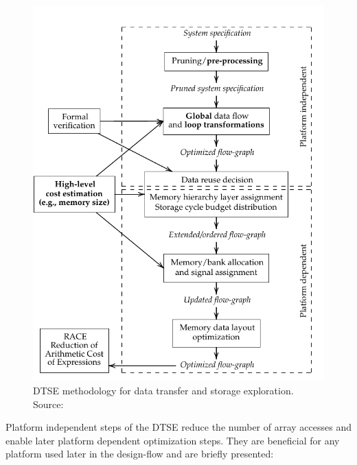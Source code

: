 \begin{figure}
	\centering
	\includegraphics[scale=0.9]{Images/dtse1.pdf}
	\caption{DTSE methodology for data transfer and storage exploration. Source: \cite{palkovicThesis} }
	\label{fig:dtse}
\end{figure}

Platform independent steps of the DTSE reduce the number of array accesses and enable later platform dependent optimization steps. 
They are beneficial for any platform used later in the design-flow and are briefly presented:

